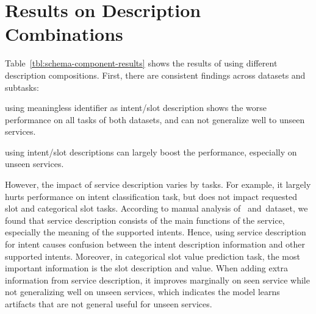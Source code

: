 \section{Results on Description Combinations}
\label{sec:sgd:com-results}
Table~\ref{tbl:schema-component-results} shows the results of using
different description compositions. First, there are consistent
findings across datasets and subtasks:
\begin{inparaenum}[(1)]
 \item using meaningless identifier as intent/slot description shows
  the worse performance on all tasks of both datasets, and can
  not generalize well to unseen services.
 \item using intent/slot descriptions can largely boost the performance,
  especially on unseen services.
\end{inparaenum}

However, the impact of service description varies by tasks. For
example, it largely hurts performance on intent classification task,
but does not impact %
requested slot and categorical slot tasks. According to manual
analysis of \sgdst~and~\multiwoz dataset, we found that service
description consists of the main functions of the service, especially
the meaning of the supported intents. Hence, using service description
for intent causes confusion between the intent description information
and other supported intents. Moreover, in categorical slot value
prediction task, the most important information is the slot
description and value.  When adding extra information from service
description, it improves marginally on seen service while not
generalizing well on unseen services, which indicates the model learns
artifacts that are not general useful for unseen services.

